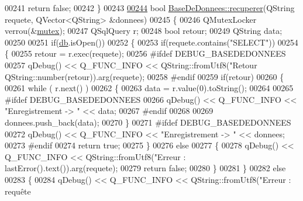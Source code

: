 \begin{DoxyCode}
{{{{{{{{{{00241         \textcolor{keywordflow}{return} \textcolor{keyword}{false};
00242 \}
00243 
\hyperlink{class_base_de_donnees_af9a76eb2b12df784280c379a4b22af62}{00244} \textcolor{keywordtype}{bool} \hyperlink{class_base_de_donnees_a77539baad389f5acf754cd2cd452403e}{BaseDeDonnees::recuperer}(QString requete, QVector<QString> &donnees)
00245 \{
00246     QMutexLocker verrou(&\hyperlink{class_base_de_donnees_aa1b4696fac87a740f914aa73739086f2}{mutex});
00247     QSqlQuery r;
00248     \textcolor{keywordtype}{bool} retour;
00249     QString data;
00250 
00251     \textcolor{keywordflow}{if}(\hyperlink{class_base_de_donnees_a3e738dcf443370c46a541677ab619f06}{db}.isOpen())
00252     \{
00253         \textcolor{keywordflow}{if}(requete.contains(\textcolor{stringliteral}{"SELECT"}))
00254         \{
00255             retour = r.exec(requete);
00256 \textcolor{preprocessor}{            #ifdef DEBUG\_BASEDEDONNEES}
00257             qDebug() << Q\_FUNC\_INFO << QString::fromUtf8(\textcolor{stringliteral}{"Retour %
      QString::number(retour)).arg(requete);
00258 \textcolor{preprocessor}{            #endif}
00259             \textcolor{keywordflow}{if}(retour)
00260             \{
00261                 \textcolor{keywordflow}{while} ( r.next() )
00262                 \{
00263                     data = r.value(0).toString();
00264 
00265 \textcolor{preprocessor}{                    #ifdef DEBUG\_BASEDEDONNEES}
00266                     qDebug() << Q\_FUNC\_INFO << \textcolor{stringliteral}{"Enregistrement -> "} << data;
00267 \textcolor{preprocessor}{                    #endif}
00268 
00269                     donnees.push\_back(data);
00270                 \}
00271 \textcolor{preprocessor}{                #ifdef DEBUG\_BASEDEDONNEES}
00272                 qDebug() << Q\_FUNC\_INFO << \textcolor{stringliteral}{"Enregistrement -> "} << donnees;
00273 \textcolor{preprocessor}{                #endif}
00274                 \textcolor{keywordflow}{return} \textcolor{keyword}{true};
00275             \}
00276             \textcolor{keywordflow}{else}
00277             \{
00278                 qDebug() << Q\_FUNC\_INFO << QString::fromUtf8(\textcolor{stringliteral}{"Erreur : %
      lastError().text()).arg(requete);
00279                 \textcolor{keywordflow}{return} \textcolor{keyword}{false};
00280             \}
00281         \}
00282         \textcolor{keywordflow}{else}
00283         \{
00284             qDebug() << Q\_FUNC\_INFO << QString::fromUtf8(\textcolor{stringliteral}{"Erreur : requête %
}}}}}}}}}}}}}
\end{DoxyCode}
